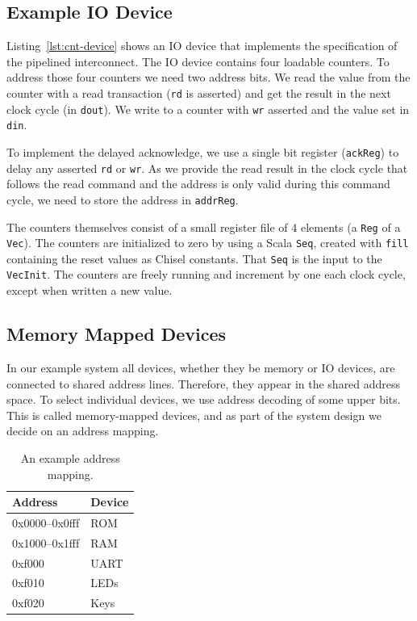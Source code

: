 \documentclass[%
    10pt,
    headinclude, footexclude,
    openright, %
    notitlepage,
    cleardoubleempty,
    headsepline,
    pointlessnumbers,
    bibtotoc, idxtotoc,
    ]{scrbook}
\newcommand{\code}[1]{{\small{\texttt{#1}}}}
\begin{document}
\subsection{Example IO Device}


Listing~\ref{lst:cnt-device} shows an IO device that implements the specification of the
pipelined interconnect. The IO device contains four loadable counters. To address those four
counters we need two address bits. We read the value from the counter with a read transaction
(\code{rd} is asserted) and get the result in the next clock cycle (in \code{dout}). We write to a counter with
\code{wr} asserted and the value set in \code{din}.

To implement the delayed acknowledge, we use a single bit register (\code{ackReg}) to
delay any asserted \code{rd} or \code{wr}. As we provide the read result in
the clock cycle that follows the read command and the address is only valid during this
command cycle, we need to store the address in \code{addrReg}.

The counters themselves consist of a small register file of 4 elements (a \code{Reg} of a \code{Vec}).
The counters are initialized to zero by using a Scala \code{Seq}, created with \code{fill}
containing the reset values as Chisel constants. That \code{Seq} is the input to the \code{VecInit}.
The counters are freely running and increment by one each clock cycle, except when written
a new value.

\subsection{Memory Mapped Devices}

In our example system all devices, whether they be memory or IO devices, are connected to shared
address lines. Therefore, they appear in the shared address space. To select individual
devices, we use address decoding of some upper bits. This is called memory-mapped devices,
and as part of the system design we decide on an address mapping.

\begin{table}
\centering
\begin{tabular}{ll}
\toprule
Address & Device \\
\midrule
0x0000--0x0fff & ROM \\
0x1000--0x1fff & RAM \\
0xf000 & UART \\
0xf010 & LEDs \\
0xf020 & Keys \\
\bottomrule
\end{tabular}
\caption{An example address mapping.}
\label{tab:addr:map}
\end{table}
\end{document}
